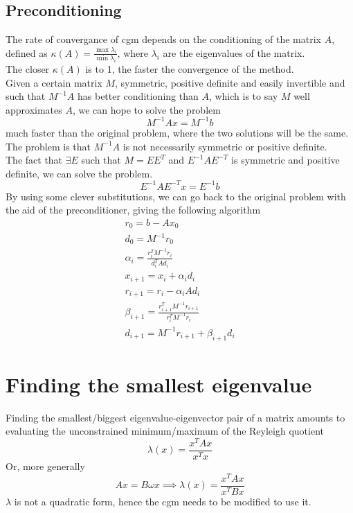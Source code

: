 \documentclass{article}
\begin{document}
\subsection{Preconditioning}
The rate of convergance of cgm depends on the conditioning of the matrix $A$, defined as $\kappa(A)=\frac{\max{\lambda_i}}{\min{\lambda_i}}$, where $\lambda_i$ are the eigenvalues of the matrix.
\\The closer $\kappa(A)$ is to 1, the faster the convergence of the method.
\\Given a certain matrix $M$, symmetric, positive definite and easily invertible and such that $M^{-1}A$ has better conditioning than $A$, which is to say $M$ well approximates $A$, we can hope to solve the problem
\begin{equation}
    M^{-1}Ax = M^{-1}b 
\end{equation}
much faster than the original problem, where the two solutions will be the same.
\\The problem is that $M^{-1}A$ is not necessarily symmetric or positive definite.
\\The fact that $\exists E$ such that $M=EE^T$ and $E^{-1}AE^{-T}$ is symmetric and positive definite, we can solve the problem.
\begin{equation}
    E^{-1}AE^{-T}x = E^{-1}b
\end{equation}
By using some clever substitutions, we can go back to the original problem with the aid of the preconditioner, giving the following algorithm
\begin{align*}
    r_0 = b - A x_0 \\
    d_0 = M^{-1} r_0 \\
    \alpha_i = \frac{r_i^T M^{-1} r_i}{d_i^T A d_i} \\
    x_{i+1} = x_i + \alpha_i d_i \\
    r_{i+1} = r_i - \alpha_i A d_i \\
    \beta_{i+1} = \frac{r_{i+1}^T M^{-1} r_{i+1}}{r_i^T M^{-1} r_i} \\
    d_{i+1} = M^{-1} r_{i+1} + \beta_{i+1} d_i
\end{align*}

\section{Finding the smallest eigenvalue}
Finding the smallest/biggest eigenvalue-eigenvector pair of a matrix amounts to evaluating the unconstrained minimum/maximum of the Reyleigh quotient
\begin{equation}
    \lambda(x)=\frac{x^T Ax}{x^T x}
\end{equation}
Or, more generally
\begin{equation}
    Ax = B\omega x \implies \lambda(x)=\frac{x^T Ax}{x^T Bx}
\end{equation}
$\lambda$ is not a quadratic form, hence the cgm needs to be modified to use it.
\end{document}
